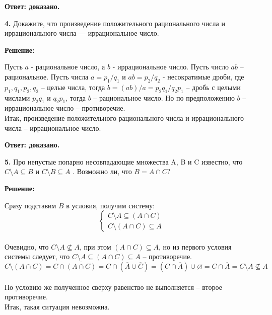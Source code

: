 \documentclass[a4paper,12pt]{article} %
\begin{document}
 
\begin{flushright}
\begin{large}
\textbf {Ответ: доказано.}
\end{large}
\end{flushright}


{\bf 4.} Докажите, что произведение положительного рационального числа и иррационального числа — иррациональное число.
\begin{center}
\bfseries
{\Large Решение: }
\end{center}
Пусть $a$ - рациональное число, а $b$ - иррациональное число. Пусть число $ab$ -- рациональное. Пусть числа $a = p_1/q_1$ и $ab = p_2/q_2$ - несократимые дроби, где $p_1, q_1, p_2, q_2$ -- целые числа, тогда $b = (ab)/a = p_2q_1/q_2p_1 $ -- дробь с целыми числами $p_2q_1$ и $q_2p_1$, тогда $b$ -- рациональное число. Но по предположению $b$ -- иррациональное число -- противоречие. \\
Итак, произведение положительного рационального числа и иррационального числа -- иррациональное число.


\begin{flushright}
\begin{large}
\textbf {Ответ: доказано.}
\end{large}
\end{flushright}

{\bf 5.} Про непустые попарно несовпадающие множества A, B и C известно,
что $C \setminus A \subseteq B $ и $C \setminus B \subseteq A$ . Возможно ли, что $B = A \cap C?$


\begin{center}
\bfseries
{\Large Решение: }
\end{center}
Сразу подставим $B$ в условия, получим систему:
   \[\begin{cases}
  C \setminus A \subseteq (A \cap C)\\
  C \setminus (A \cap C) \subseteq A 
 \end{cases}\]\\ 
 Очевидно, что $C \setminus A \nsubseteq A$, при этом $(A \cap C)\subseteq A$, но из первого условия системы следует, что $C \setminus A \subseteq (A \cap C) \subseteq A $ -- противоречие.
\[C \setminus (A \cap C) = C \cap \overline{(A \cap C)} = C \cap (\overline{A} \cup \overline{C}) = (C \cap \overline{A}) \cup \varnothing = C \cap \overline{A} = C \setminus A \nsubseteq A\]\\
По условию же полученное сверху равенство не выполняется -- второе противоречие.\\
Итак, такая ситуация невозможна.
\end{document}
